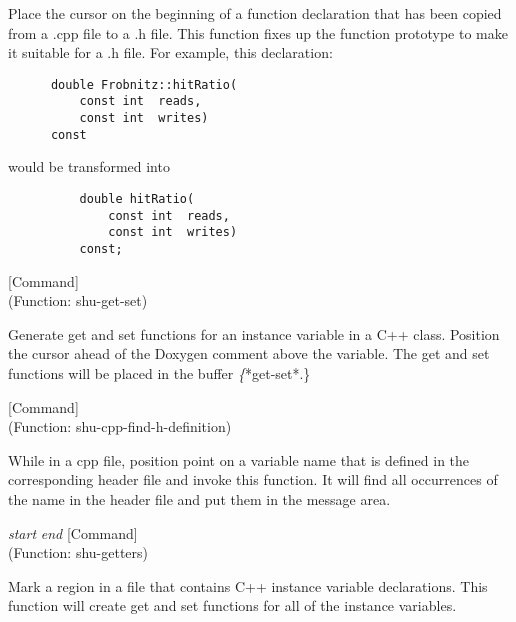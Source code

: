 \begin{doc-string}
Place the cursor on the beginning of a function declaration that has been
copied from a .cpp file to a .h file.  This function fixes up the function
prototype to make it suitable for a .h file.
For example, this declaration:

\small{\begin{verbatim}
      double Frobnitz::hitRatio(
          const int  reads,
          const int  writes)
      const
\end{verbatim}}

would be transformed into

\small{\begin{verbatim}
          double hitRatio(
              const int  reads,
              const int  writes)
          const;
\end{verbatim}}
\end{doc-string}

\vspace{1em}
\noindent
{}
\usebox{\funcname}
 \hfill [Command]\\%
 (Function: shu-get-set)

\begin{doc-string}
Generate get and set functions for an instance variable in a C++ class.
Position the cursor ahead of the Doxygen comment above the variable.  The get
and set functions will be placed in the buffer \emph\{*get-set*.\}
\end{doc-string}

\vspace{1em}
\noindent
{}
\usebox{\funcname}
 \hfill [Command]\\%
 (Function: shu-cpp-find-h-definition)

\begin{doc-string}
While in a cpp file, position point on a variable name that is defined in the
corresponding header file and invoke this function.  It will find all occurrences of
the name in the header file and put them in the message area.
\end{doc-string}

\vspace{1em}
\noindent
{}
\usebox{\funcname}\emph{start} \emph{end}
 \hfill [Command]\\%
 (Function: shu-getters)

\begin{doc-string}
Mark a region in a file that contains C++ instance variable declarations.
This function will create get and set functions for all of the instance
variables.
\end{doc-string}

